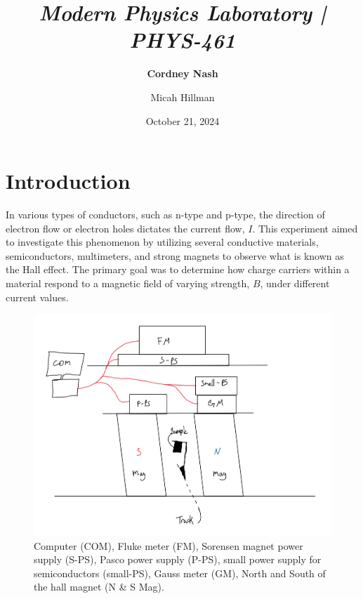 \documentclass[a4paper,12pt,english]{all-in-one} %
\title{{\large\textit{Modern Physics Laboratory | PHYS-461}}\\[0.5cm]{\Huge\color{gray}\textsc{\@docsubtitle}}}
\author{\textbf{Cordney Nash}  \and Micah Hillman  }
\date{October 21, 2024}
\begin{document}
\begin{titlepage}
\maketitle\vfill
\end{titlepage}
\newpage


\section*{Introduction}
{
In various types of conductors, such as n-type and p-type, the direction of electron flow or electron holes dictates the current flow, $I$. This experiment aimed to investigate this phenomenon by utilizing several conductive materials, semiconductors, multimeters, and strong magnets to observe what is known as the Hall effect. The primary goal was to determine how charge carriers within a material respond to a magnetic field of varying strength, $B$, under different current values.
}

\begin{figure}[tbh]
    \centering
    \includegraphics[width=0.8\linewidth]{4-hall_effect/overleaf/images/Screenshot from 2024-10-21 20-48-31.png}
    \caption{ \scriptsize{ Computer (COM), Fluke meter (FM), Sorensen magnet power supply (S-PS), Pasco power supply (P-PS), small power supply for semiconductors (small-PS), Gauss meter (GM), North and South of the hall magnet (N \& S Mag).
    }}
    \label{fig:xray-diagram}
\end{figure}
\end{document}
